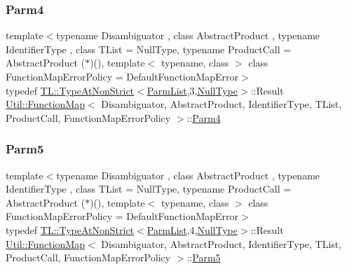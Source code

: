 \subsubsection{\texorpdfstring{Parm4}{Parm4}\hspace{0.1cm}{\footnotesize\ttfamily [3/3]}}
{\footnotesize\ttfamily template$<$typename Disambiguator , class Abstract\+Product , typename Identifier\+Type , class T\+List  = Null\+Type, typename Product\+Call  = Abstract\+Product ($\ast$)(), template$<$ typename, class $>$ class Function\+Map\+Error\+Policy = Default\+Function\+Map\+Error$>$ \\
typedef \mbox{\hyperlink{structUtil_1_1TL_1_1TypeAtNonStrict}{T\+L\+::\+Type\+At\+Non\+Strict}}$<$\mbox{\hyperlink{classUtil_1_1FunctionMap_a6cf0e6766cf6f20642ba61c4994bb477}{Parm\+List}},3,\mbox{\hyperlink{classUtil_1_1NullType}{Null\+Type}}$>$\+::Result \mbox{\hyperlink{classUtil_1_1FunctionMap}{Util\+::\+Function\+Map}}$<$ Disambiguator, Abstract\+Product, Identifier\+Type, T\+List, Product\+Call, Function\+Map\+Error\+Policy $>$\+::\mbox{\hyperlink{classUtil_1_1FunctionMap_a912703c1f39a6e219b2449183e48fb07}{Parm4}}}

\mbox{\label{classUtil_1_1FunctionMap_a993589d5b721f73c7905377e24dbf9f4}} 
\subsubsection{\texorpdfstring{Parm5}{Parm5}\hspace{0.1cm}{\footnotesize\ttfamily [1/3]}}
{\footnotesize\ttfamily template$<$typename Disambiguator , class Abstract\+Product , typename Identifier\+Type , class T\+List  = Null\+Type, typename Product\+Call  = Abstract\+Product ($\ast$)(), template$<$ typename, class $>$ class Function\+Map\+Error\+Policy = Default\+Function\+Map\+Error$>$ \\
typedef \mbox{\hyperlink{structUtil_1_1TL_1_1TypeAtNonStrict}{T\+L\+::\+Type\+At\+Non\+Strict}}$<$\mbox{\hyperlink{classUtil_1_1FunctionMap_a6cf0e6766cf6f20642ba61c4994bb477}{Parm\+List}},4,\mbox{\hyperlink{classUtil_1_1NullType}{Null\+Type}}$>$\+::Result \mbox{\hyperlink{classUtil_1_1FunctionMap}{Util\+::\+Function\+Map}}$<$ Disambiguator, Abstract\+Product, Identifier\+Type, T\+List, Product\+Call, Function\+Map\+Error\+Policy $>$\+::\mbox{\hyperlink{classUtil_1_1FunctionMap_a993589d5b721f73c7905377e24dbf9f4}{Parm5}}}

